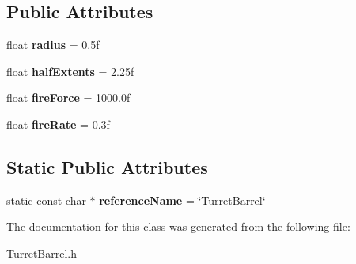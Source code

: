 \subsection*{Public Attributes}
\begin{DoxyCompactItemize}
\item 
\hypertarget{class_arena_1_1_turret_barrel_a71eb0c8218c37f5a66ad90f78701ae2b}{float {\bfseries radius} = 0.\+5f}\label{class_arena_1_1_turret_barrel_a71eb0c8218c37f5a66ad90f78701ae2b}

\item 
\hypertarget{class_arena_1_1_turret_barrel_ae1fd3b10f222a7e69ab9143cfb172571}{float {\bfseries half\+Extents} = 2.\+25f}\label{class_arena_1_1_turret_barrel_ae1fd3b10f222a7e69ab9143cfb172571}

\item 
\hypertarget{class_arena_1_1_turret_barrel_afb6d89103f8374579e169d8d84208686}{float {\bfseries fire\+Force} = 1000.\+0f}\label{class_arena_1_1_turret_barrel_afb6d89103f8374579e169d8d84208686}

\item 
\hypertarget{class_arena_1_1_turret_barrel_ab078a2a9c25e921d108517c96ba74a0b}{float {\bfseries fire\+Rate} = 0.\+3f}\label{class_arena_1_1_turret_barrel_ab078a2a9c25e921d108517c96ba74a0b}

\end{DoxyCompactItemize}
\subsection*{Static Public Attributes}
\begin{DoxyCompactItemize}
\item 
\hypertarget{class_arena_1_1_turret_barrel_ad29f45681c7a197c3e6335182048df6c}{static const char $\ast$ {\bfseries reference\+Name} = \char`\"{}Turret\+Barrel\char`\"{}}\label{class_arena_1_1_turret_barrel_ad29f45681c7a197c3e6335182048df6c}

\end{DoxyCompactItemize}


The documentation for this class was generated from the following file\+:\begin{DoxyCompactItemize}
\item 
Turret\+Barrel.\+h\end{DoxyCompactItemize}
